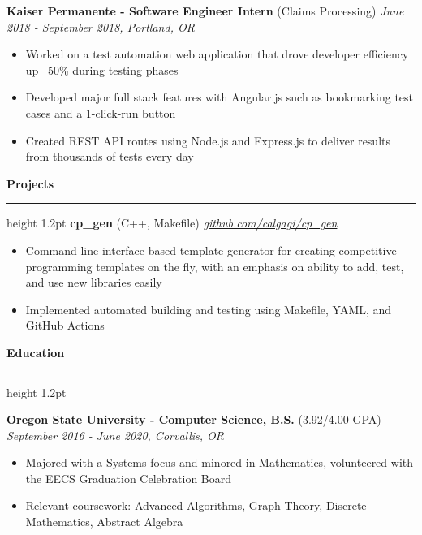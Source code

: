 \documentclass[11pt,letterpaper,ragged2e,withhyper]{dodiresume}
\def\hrulefill{\leavevmode\leaders\hrule height 1.2pt\hfill\kern\z}
\begin{document}
\vskip 0.1in

\noindent \normalsize \textbf{Kaiser Permanente - Software Engineer Intern} \footnotesize (Claims Processing) \hfill \small \textit{June 2018 - September 2018, Portland, OR}
\begin{itemize}
	\item Worked on a test automation web application that drove developer efficiency up ~50\% during testing phases
	\item Developed major full stack features with Angular.js such as bookmarking test cases and a 1-click-run button
	\item Created REST API routes using Node.js and Express.js to deliver results from thousands of tests every day
\end{itemize}

\vskip 0.1in

\noindent \large \textbf{Projects } \hrulefill
\vskip 0.1in
\noindent \normalsize \textbf{cp\_gen} \footnotesize (C++, Makefile) \hfill \small \textit{\href{https://github.com/calgagi/cp_gen}{github.com/calgagi/cp\_gen}}
\begin{itemize}
	\item Command line interface-based template generator for creating competitive programming templates on the fly, with an emphasis on ability to add, test, and use new libraries easily
	\item Implemented automated building and testing using Makefile, YAML, and GitHub Actions
\end{itemize}

\vskip 0.1in

\noindent \large \textbf{Education } \hrulefill
\vskip 0.1in

\noindent \normalsize \textbf{Oregon State University - Computer Science, B.S.} \footnotesize (3.92/4.00 GPA) \hfill \small \textit{September 2016 - June 2020, Corvallis, OR}
\begin{itemize}
	\item Majored with a Systems focus and minored in Mathematics, volunteered with the EECS Graduation Celebration Board
	\item Relevant coursework: Advanced Algorithms, Graph Theory, Discrete Mathematics, Abstract Algebra
\end{itemize}
\end{document}
